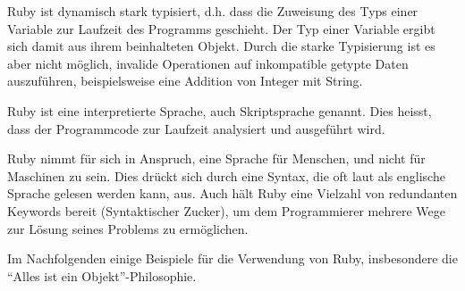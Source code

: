 Ruby ist dynamisch stark typisiert, d.h. dass die Zuweisung des Typs einer Variable zur Laufzeit des Programms geschieht. Der Typ einer Variable ergibt sich damit aus ihrem beinhalteten Objekt. Durch die starke Typisierung ist es aber nicht möglich, invalide Operationen auf inkompatible getypte Daten auszuführen, beispielsweise eine Addition von Integer mit String.

Ruby ist eine interpretierte Sprache, auch Skriptsprache genannt. Dies heisst, dass der Programmcode zur Laufzeit analysiert und ausgeführt wird. 

Ruby nimmt für sich in Anspruch, eine Sprache für Menschen, und nicht für Maschinen zu sein. Dies drückt sich durch eine Syntax, die oft laut als englische Sprache gelesen werden kann, aus. Auch hält Ruby eine Vielzahl von redundanten Keywords bereit (Syntaktischer Zucker), um dem Programmierer mehrere Wege zur Lösung seines Problems zu ermöglichen.

\setlength{\epigraphwidth}{\marginparwidth}
\setlength{\epigraphwidth}{0.8\textwidth}

Im Nachfolgenden einige Beispiele für die Verwendung von Ruby, insbesondere die "`Alles ist ein Objekt"'-Philosophie.

 \begin{ruby}[label=Interaktive Ruby Sitzung (IRB)]
    
      
    
     
 \end{ruby}

